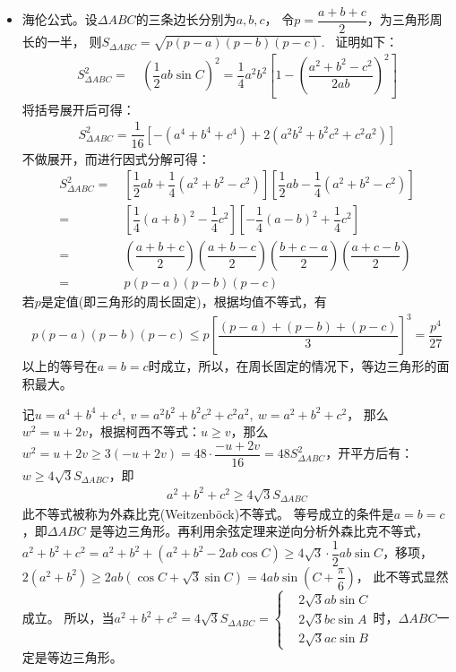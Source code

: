 \begin{itemize}[leftmargin=\inteval{\myitemleftmargin}pt,itemsep=
   \inteval{\myitemitempsep}pt,topsep=\inteval{\myitemtopsep}pt]
\item 海伦公式。设$ \Delta ABC $的三条边长分别为$ a,b,c $，
令$ p=\dfrac{a+b+c}{2} $，为三角形周长的一半，
则$ S_{\Delta ABC}=\sqrt{p(p-a)(p-b)(p-c)} $. \ 证明如下：
\begin{align*}
    S_{\Delta ABC}^2=&\ \left(\dfrac{1}{2}ab\sin C \right) ^2=
    \dfrac{1}{4}a^2b^2\left[ 1-\left( {\dfrac{a^2+b^2-c^2}{2ab}}\right)^2 \right] 
\end{align*}
将括号展开后可得：
\begin{align*}
    S_{\Delta ABC}^2=\dfrac{1}{16}\left[-(a^4+b^4+c^4)+2(a^2b^2+b^2c^2+c^2a^2)\right]
\end{align*}
不做展开，而进行因式分解可得：
\begin{align*}
    S_{\Delta ABC}^2
    =&\ \left[ \dfrac{1}{2}ab+\dfrac{1}{4}
    (a^2+b^2-c^2)\right] \left[ \dfrac{1}{2}ab-\dfrac{1}{4} (a^2+b^2-c^2) \right] \\
    =&\ \left[  \dfrac{1}{4}(a+b)^2-\dfrac{1}{4}c^2 \right] 
    \left[ -\dfrac{1}{4}(a-b)^2+\dfrac{1}{4}c^2 \right] \\
    =&\ \left(\dfrac{a+b+c}{2}\right) \left(\dfrac{a+b-c}{2}\right) 
    \left(\dfrac{b+c-a}{2}\right) \left(\dfrac{a+c-b}{2}\right) \\
    =&\ p(p-a)(p-b)(p-c)
\end{align*}
若$ p $是定值(即三角形的周长固定)，根据均值不等式，有
\begin{gather}\label{正三角形面积最大}
    p(p-a)(p-b)(p-c)\leq p\left[\dfrac{(p-a)+(p-b)+(p-c)}{3}\right]^3=\dfrac{p^4}{27}
\end{gather}
以上的等号在$ a=b=c $时成立，所以，在周长固定的情况下，等边三角形的面积最大。

记$ u=a^4+b^4+c^4,\ v=a^2b^2+b^2c^2+c^2a^2 ,\ w=a^2+b^2+c^2 $，
那么$ w^2=u+2v $，根据柯西不等式：$ u\geq v $，那么$ w^2=u+2v \geq 3(-u+2v)=
48 \cdot \dfrac{-u+2v}{16}=48 S_{\Delta ABC}^2 $，开平方后有：
$ w\geq 4\sqrt{3}S_{\Delta ABC} $，即
\begin{gather}\label{外森比克不等式}
    a^2+b^2+c^2 \geq 4\sqrt{3}S_{\Delta ABC}
\end{gather}
此不等式被称为外森比克(Weitzenböck)不等式。
等号成立的条件是$ a=b=c $，即$ \Delta ABC $
是等边三角形。再利用余弦定理来逆向分析外森比克不等式，
$ a^2+b^2+c^2=a^2+b^2+(a^2+b^2-2ab\cos C)\geq 4\sqrt{3}\cdot
\dfrac{1}{2}ab\sin C $，移项，
$ 2(a^2+b^2)\geq 2ab(\cos C+\sqrt{3}\sin C)=4ab\sin(C+\dfrac{\pi}{6}) $，
此不等式显然成立。 所以，当$ a^2+b^2+c^2=4\sqrt{3}S_{\Delta ABC}=
\left\{\begin{aligned}
    & 2\sqrt{3}ab\sin C \\
    & 2\sqrt{3}bc\sin A \\
    & 2\sqrt{3}ac\sin B
\end{aligned}\right. $时，$ \Delta ABC $一定是等边三角形。


\end{itemize}
